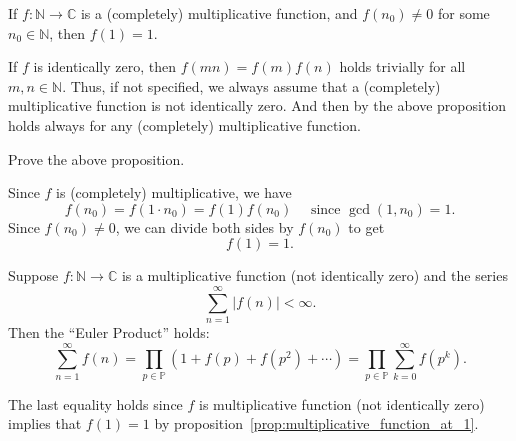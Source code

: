 \documentclass{elegantbook}
\begin{document}
\begin{proposition} \label{prop:multiplicative_function_at_1}
  If $f:\mathbb{N} \to \mathbb{C}$ is a (completely) multiplicative function, and $f(n_0)\ne0$ for some $n_0\in\mathbb{N}$, then $f(1)=1$.
\end{proposition}

\begin{note}
  If $f$ is identically zero, then $f(mn)=f(m)f(n)$ holds trivially for all $m,n\in\mathbb{N}$. Thus, if not specified, we always assume that a (completely) multiplicative function is not identically zero. And then by the above proposition holds always for any (completely) multiplicative function.
\end{note}

\begin{exercise}
  Prove the above proposition.
\end{exercise}

\begin{solution}
  Since $f$ is (completely) multiplicative, we have
  \[
    f(n_0) = f(1 \cdot n_0) = f(1) f(n_0) \quad \text{ since } \gcd(1, n_0) = 1.
  \]
  Since $f(n_0) \ne 0$, we can divide both sides by $f(n_0)$ to get
  \[
    f(1) = 1.
  \]
\end{solution}

\begin{lemma} \label{lem:euler_product_lemma}
  Suppose $f:\mathbb{N} \to \mathbb{C}$ is a multiplicative function (not identically zero) and the series
  \[
    \sum_{n=1}^{\infty} |f(n)|<\infty.
  \]
  Then the ``Euler Product'' holds:
  \[
    \sum_{n=1}^{\infty} f(n) = \prod_{p\in\mathbb{P}} \left(1 + f(p) + f(p^2) + \cdots\right)=\prod_{p\in\mathbb{P}}\sum_{k=0}^{\infty} f(p^k).
  \]
\end{lemma}

\begin{note}
  The last equality holds since $f$ is multiplicative function (not identically zero) implies that $f(1)=1$ by proposition~\ref{prop:multiplicative_function_at_1}.
\end{note}
\end{document}
